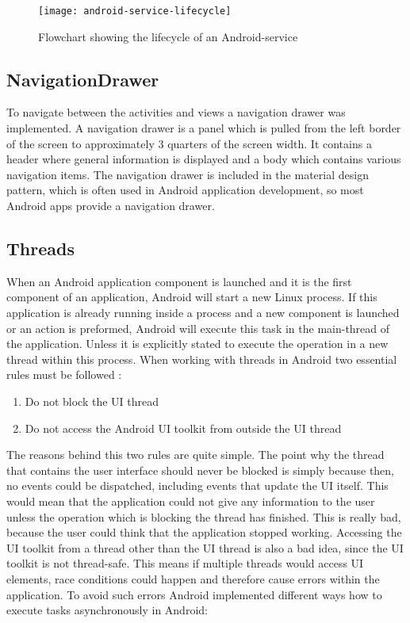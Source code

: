 \begin{figure}[H]
    \centering
    \texttt{[image: android-service-lifecycle]}
    \caption{Flowchart showing the lifecycle of an Android-service}
    \label{fig:servicelifecycle}
\end{figure}

\subsection{NavigationDrawer}
To navigate between the activities and views a navigation drawer was implemented. A navigation drawer is a panel which is pulled from the left border of the screen to approximately 3 quarters of the screen width. It contains a header where general information is displayed and a body which contains various navigation items. The navigation drawer is included in the material design pattern, which is often used in Android application development, so most Android apps provide a navigation drawer.

\subsection{Threads}
When an Android application component is launched and it is the first component of an application, Android will start a new Linux process. If this application is already running inside a process and a new component is launched or an action is preformed, Android will execute this task in the main-thread of the application. Unless it is explicitly stated to execute the operation in a new thread within this process. When working with threads in Android two essential rules must be followed \autocite{AndroidThreads} :

\begin{enumerate}
    \item Do not block the UI thread
    \item Do not access the Android UI toolkit from outside the UI thread
\end{enumerate}

\noindent The reasons behind this two rules are quite simple. The point why the thread that contains the user interface should never be blocked is simply because then, no events could be dispatched, including events that update the UI itself. This would mean that the application could not give any information to the user unless the operation which is blocking the thread has finished. This is really bad, because the user could think that the application stopped working. Accessing the UI toolkit from a thread other than the UI thread is also a bad idea, since the UI toolkit is not thread-safe. This means if multiple threads would access UI elements, race conditions could happen and therefore cause errors within the application. To avoid such errors Android implemented different ways how to execute tasks asynchronously in Android:

